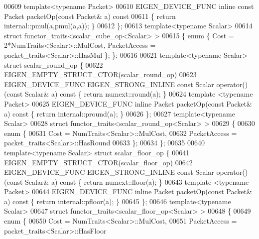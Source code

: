 \begin{DoxyCode}
00609   \textcolor{keyword}{template}<\textcolor{keyword}{typename} Packet>
00610   EIGEN\_DEVICE\_FUNC \textcolor{keyword}{inline} \textcolor{keyword}{const} Packet packetOp(\textcolor{keyword}{const} Packet& a)\textcolor{keyword}{ const}
00611 \textcolor{keyword}{  }\{ \textcolor{keywordflow}{return} internal::pmul(a,pmul(a,a)); \}
00612 \};
00613 \textcolor{keyword}{template}<\textcolor{keyword}{typename} Scalar>
00614 \textcolor{keyword}{struct }functor\_traits<scalar\_cube\_op<Scalar> >
00615 \{ \textcolor{keyword}{enum} \{ Cost = 2*NumTraits<Scalar>::MulCost, PacketAccess = packet\_traits<Scalar>::HasMul \}; \};
00616 
00621 \textcolor{keyword}{template}<\textcolor{keyword}{typename} Scalar> \textcolor{keyword}{struct }scalar\_round\_op \{
00622   EIGEN\_EMPTY\_STRUCT\_CTOR(scalar\_round\_op)
00623   EIGEN\_DEVICE\_FUNC EIGEN\_STRONG\_INLINE \textcolor{keyword}{const} Scalar operator() (\textcolor{keyword}{const} Scalar& a)\textcolor{keyword}{ const }\{ \textcolor{keywordflow}{return} 
      numext::round(a); \}
00624   \textcolor{keyword}{template} <\textcolor{keyword}{typename} Packet>
00625   EIGEN\_DEVICE\_FUNC \textcolor{keyword}{inline} Packet packetOp(\textcolor{keyword}{const} Packet& a)\textcolor{keyword}{ const }\{ \textcolor{keywordflow}{return} internal::pround(a); \}
00626 \};
00627 \textcolor{keyword}{template}<\textcolor{keyword}{typename} Scalar>
00628 \textcolor{keyword}{struct }functor\_traits<scalar\_round\_op<Scalar> >
00629 \{
00630   \textcolor{keyword}{enum} \{
00631     Cost = NumTraits<Scalar>::MulCost,
00632     PacketAccess = packet\_traits<Scalar>::HasRound
00633   \};
00634 \};
00635 
00640 \textcolor{keyword}{template}<\textcolor{keyword}{typename} Scalar> \textcolor{keyword}{struct }scalar\_floor\_op \{
00641   EIGEN\_EMPTY\_STRUCT\_CTOR(scalar\_floor\_op)
00642   EIGEN\_DEVICE\_FUNC EIGEN\_STRONG\_INLINE \textcolor{keyword}{const} Scalar operator() (\textcolor{keyword}{const} Scalar& a)\textcolor{keyword}{ const }\{ \textcolor{keywordflow}{return} 
      numext::floor(a); \}
00643   \textcolor{keyword}{template} <\textcolor{keyword}{typename} Packet>
00644   EIGEN\_DEVICE\_FUNC \textcolor{keyword}{inline} Packet packetOp(\textcolor{keyword}{const} Packet& a)\textcolor{keyword}{ const }\{ \textcolor{keywordflow}{return} internal::pfloor(a); \}
00645 \};
00646 \textcolor{keyword}{template}<\textcolor{keyword}{typename} Scalar>
00647 \textcolor{keyword}{struct }functor\_traits<scalar\_floor\_op<Scalar> >
00648 \{
00649   \textcolor{keyword}{enum} \{
00650     Cost = NumTraits<Scalar>::MulCost,
00651     PacketAccess = packet\_traits<Scalar>::HasFloor

\end{DoxyCode}
